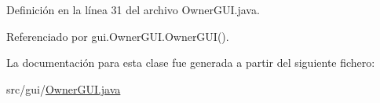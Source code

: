Definición en la línea 31 del archivo Owner\+G\+U\+I.\+java.



Referenciado por gui.\+Owner\+G\+U\+I.\+Owner\+G\+U\+I().



La documentación para esta clase fue generada a partir del siguiente fichero\+:\begin{DoxyCompactItemize}
\item 
src/gui/\mbox{\hyperlink{_owner_g_u_i_8java}{Owner\+G\+U\+I.\+java}}\end{DoxyCompactItemize}
